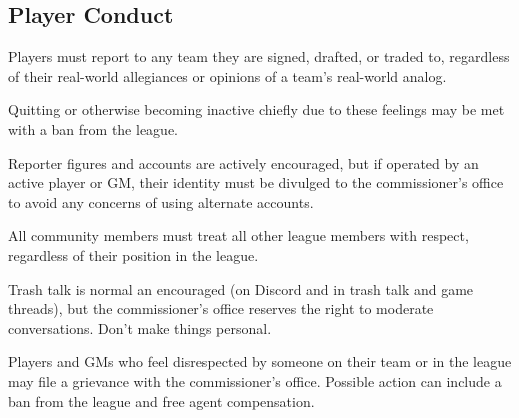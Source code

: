 \subsection{Player Conduct}
\begin{deepEnumerate}
	\item Players must report to any team they are signed, drafted, or traded to,
	regardless of their real-world allegiances or opinions of a team's real-world analog.
	\begin{deepEnumerate}
		\item Quitting or otherwise becoming inactive 
		chiefly due to these feelings
		may be met with a ban from the league.
	\end{deepEnumerate}
	\item Reporter figures and accounts are actively encouraged,
	\label{sec:reporters}
	but if operated by an active player or GM,
	their identity must be divulged to the commissioner's office
	to avoid any concerns of using alternate accounts.
	\item All community members must treat all other league members with respect,
	regardless of their position in the league.
	\begin{deepEnumerate}
		\item Trash talk is normal an encouraged
		(on Discord and in trash talk and game threads),
		but the commissioner's office reserves the right to moderate conversations.
		Don't make things personal.
		\item Players and GMs who feel disrespected by someone on their team or in the league 
		may file a grievance with the commissioner's office.
		Possible action can include a ban from the league and free agent compensation.
	\end{deepEnumerate}
\end{deepEnumerate}